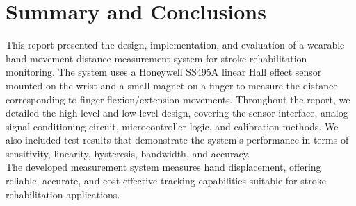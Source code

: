 \documentclass[a4paper,12pt]{article}
\begin{document}
%
\section{Summary and Conclusions}
This report presented the design, implementation, and evaluation of a wearable hand movement distance measurement system for stroke rehabilitation monitoring. The system uses a Honeywell SS495A linear Hall effect sensor mounted on the wrist and a small magnet on a finger to measure the distance corresponding to finger flexion/extension movements. Throughout the report, we detailed the high-level and low-level design, covering the sensor interface, analog signal conditioning circuit, microcontroller logic, and calibration methods. We also included test results that demonstrate the system’s performance in terms of sensitivity, linearity, hysteresis, bandwidth, and accuracy.\\
The developed measurement system measures hand displacement, offering reliable, accurate, and cost-effective tracking capabilities suitable for stroke rehabilitation applications.


%
\newpage



\end{document}
